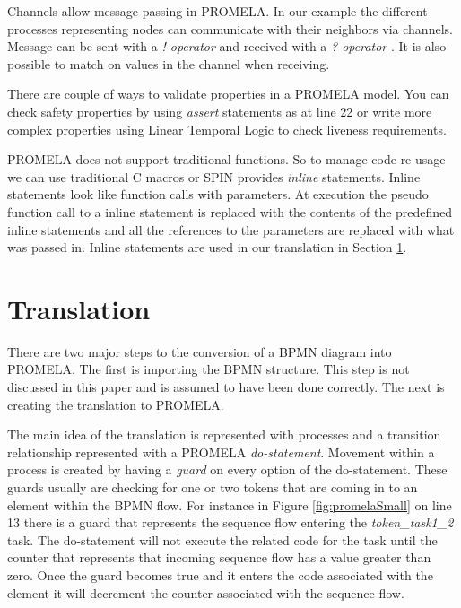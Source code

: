 \documentclass[11pt,twocolumn]{article}
\begin{document}
Channels allow message passing in PROMELA. In our example the different processes representing nodes can communicate with their neighbors via channels. Message can be sent with a \emph{!-operator}  and received with a \emph{?-operator} . It is also possible to match on values in the channel when receiving.

There are couple of ways to validate properties in a PROMELA model. You can check safety properties by using \emph{assert} statements as at line 22 or write more complex properties using Linear Temporal Logic to check liveness requirements.

PROMELA does not support traditional functions. So to manage code re-usage we can use traditional C macros or SPIN provides \emph{inline} statements. Inline statements look like function calls with parameters. At execution the pseudo function call to a inline statement is replaced with the contents of the predefined inline statements and all the references to the parameters are replaced with what was passed in. Inline statements are used in our translation in Section \ref{sec:translation}.

\section{Translation}\label{sec:translation}

There are two major steps to the conversion of a BPMN diagram into PROMELA. The first is importing the BPMN structure. This step is not discussed in this paper and is assumed to have been done correctly. The next is creating the translation to PROMELA.

The main idea of the translation is represented with processes and a transition relationship represented with a PROMELA \emph{do-statement}. Movement within a process is created by having a \emph{guard} on every option of the do-statement. These guards usually are checking for one or two tokens that are coming in to an element within the BPMN flow. For instance in Figure \ref{fig:promelaSmall} on line 13 there is a guard that represents the sequence flow entering the \emph{token\_task1\_2} task. The do-statement will not execute the related code for the task until the counter that represents that incoming sequence flow has a value greater than zero. Once the guard becomes true and it enters the code associated with the element it will decrement the counter associated with the sequence flow.
\end{document}
